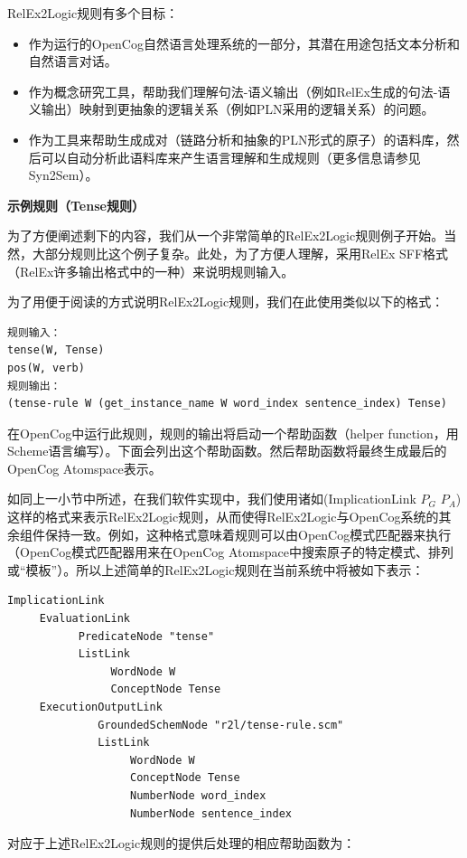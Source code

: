 RelEx2Logic规则有多个目标：

\begin{itemize}
\item 作为运行的OpenCog自然语言处理系统的一部分，其潜在用途包括文本分析和自然语言对话。
\item 作为概念研究工具，帮助我们理解句法-语义输出（例如RelEx生成的句法-语义输出）映射到更抽象的逻辑关系（例如PLN采用的逻辑关系）的问题。
\item 作为工具来帮助生成成对（链路分析和抽象的PLN形式的原子）的语料库，然后可以自动分析此语料库来产生语言理解和生成规则（更多信息请参见Syn2Sem）。
\end{itemize}

{\bf 示例规则（Tense规则）}

为了方便阐述剩下的内容，我们从一个非常简单的RelEx2Logic规则例子开始。当然，大部分规则比这个例子复杂。此处，为了方便人理解，采用RelEx SFF格式（RelEx许多输出格式中的一种）来说明规则输入。

为了用便于阅读的方式说明RelEx2Logic规则，我们在此使用类似以下的格式：

\begin{verbatim}
规则输入：
tense(W, Tense)
pos(W, verb)
规则输出：
(tense-rule W (get_instance_name W word_index sentence_index) Tense)
\end{verbatim}

在OpenCog中运行此规则，规则的输出将启动一个帮助函数（helper function，用Scheme语言编写）。下面会列出这个帮助函数。然后帮助函数将最终生成最后的OpenCog Atomspace表示。

如同上一小节中所述，在我们软件实现中，我们使用诸如(ImplicationLink $P_G$ $P_A$)这样的格式来表示RelEx2Logic规则，从而使得RelEx2Logic与OpenCog系统的其余组件保持一致。例如，这种格式意味着规则可以由OpenCog模式匹配器来执行（OpenCog模式匹配器用来在OpenCog Atomspace中搜索原子的特定模式、排列或“模板”）。所以上述简单的RelEx2Logic规则在当前系统中将被如下表示：

\begin{verbatim}
ImplicationLink
     EvaluationLink
           PredicateNode "tense"
           ListLink
                WordNode W
                ConceptNode Tense
     ExecutionOutputLink
              GroundedSchemNode "r2l/tense-rule.scm"
              ListLink
                   WordNode W
                   ConceptNode Tense
                   NumberNode word_index
                   NumberNode sentence_index

\end{verbatim}

对应于上述RelEx2Logic规则的提供后处理的相应帮助函数为：

